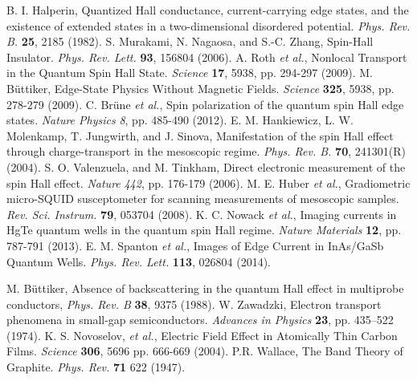 \documentclass[titlepage,a4paper]{book}
\begin{document}
\begin{thebibliography}{99}
B. I. Halperin, Quantized Hall conductance, current-carrying edge states, and the existence of extended states in a two-dimensional disordered potential. \textit{Phys. Rev. B.} \textbf{25}, 2185 (1982).
S. Murakami, N. Nagaosa, and S.-C. Zhang, Spin-Hall Insulator. \textit{Phys. Rev. Lett.} \textbf{93}, 156804 (2006).
A. Roth  \textit{et al.}, Nonlocal Transport in the Quantum Spin Hall State. \textit{Science} \textbf{17}, 5938, pp. 294-297 (2009).
M. Büttiker, Edge-State Physics Without Magnetic Fields. \textit{Science} \textbf{325}, 5938, pp. 278-279 (2009).
C. Brüne \textit{et al.}, Spin polarization of the quantum spin Hall edge states. \textit{Nature Physics} \textit{8}, pp. 485-490 (2012).
E. M. Hankiewicz, L. W. Molenkamp, T. Jungwirth, and J. Sinova, Manifestation of the spin Hall effect through charge-transport in the mesoscopic regime. \textit{Phys. Rev. B.} \textbf{70}, 241301(R) (2004).  
S. O. Valenzuela, and M. Tinkham, Direct electronic measurement of the spin Hall effect. \textit{Nature} \textit{442}, pp. 176-179 (2006).
M. E. Huber \textit{et al.}, Gradiometric micro-SQUID susceptometer for scanning measurements of mesoscopic samples. \textit{Rev. Sci. Instrum.} \textbf{79}, 053704 (2008).
K. C. Nowack \textit{et al.}, Imaging currents in HgTe quantum wells in the quantum spin Hall regime. \textit{Nature Materials} \textbf{12}, pp. 787-791 (2013).
E. M. Spanton \textit{et al.}, Images of Edge Current in InAs/GaSb Quantum Wells. \textit{Phys. Rev. Lett.} \textbf{113}, 026804 (2014).


M. Büttiker, Absence of backscattering in the quantum Hall effect in multiprobe conductors, \textit{Phys. Rev. B} \textbf{38}, 9375 (1988).
W. Zawadzki, Electron transport phenomena in small-gap semiconductors. \textit{Advances in Physics} \textbf{23}, pp. 435–522 (1974).
K. S. Novoselov, \textit{et al.}, Electric Field Effect in Atomically Thin Carbon Films. \textit{Science} \textbf{306}, 5696 pp. 666-669 (2004).
P.R. Wallace, The Band Theory of Graphite. \textit{Phys. Rev.} \textbf{71} 622 (1947).


\end{thebibliography}
\end{document}
